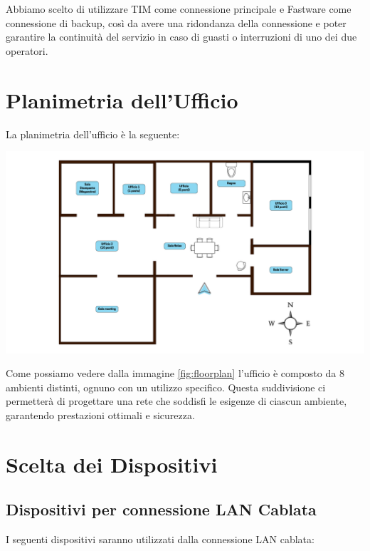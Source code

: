 \documentclass{assignment}
\begin{document}
Abbiamo scelto di utilizzare TIM come connessione principale e Fastware come connessione di backup, così da avere una ridondanza della connessione e poter garantire la continuità del servizio in caso di guasti o interruzioni di uno dei due operatori.

\section{Planimetria dell'Ufficio}

La planimetria dell'ufficio è la seguente:

\begin{center}
\includegraphics[width=\textwidth]{assets/Floor Plan Ufficio.png}
\label{fig:floorplan}
\end{center}

Come possiamo vedere dalla immagine \ref{fig:floorplan} l'ufficio è composto da 8 ambienti distinti, ognuno con un utilizzo specifico. Questa suddivisione ci permetterà di progettare una rete che soddisfi le esigenze di ciascun ambiente, garantendo prestazioni ottimali e sicurezza.


\section{Scelta dei Dispositivi}

\subsection{Dispositivi per connessione LAN Cablata}
I seguenti dispositivi saranno utilizzati dalla connessione LAN cablata:
\end{document}
